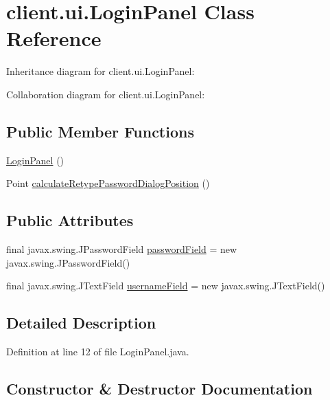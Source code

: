 \hypertarget{classclient_1_1ui_1_1_login_panel}{}\section{client.\+ui.\+Login\+Panel Class Reference}
\label{classclient_1_1ui_1_1_login_panel}


Inheritance diagram for client.\+ui.\+Login\+Panel\+:


Collaboration diagram for client.\+ui.\+Login\+Panel\+:
\subsection*{Public Member Functions}
\begin{DoxyCompactItemize}
\item 
\hyperlink{classclient_1_1ui_1_1_login_panel_a697f38b937f048e562c634c713d90885}{Login\+Panel} ()
\item 
Point \hyperlink{classclient_1_1ui_1_1_login_panel_a9726aa2bc3416aa22ad43d2b4b9eed70}{calculate\+Retype\+Password\+Dialog\+Position} ()
\end{DoxyCompactItemize}
\subsection*{Public Attributes}
\begin{DoxyCompactItemize}
\item 
final javax.\+swing.\+J\+Password\+Field \hyperlink{classclient_1_1ui_1_1_login_panel_a4b3258e8faace6462f58c79cb4a08835}{password\+Field} = new javax.\+swing.\+J\+Password\+Field()
\item 
final javax.\+swing.\+J\+Text\+Field \hyperlink{classclient_1_1ui_1_1_login_panel_a3a01950b4312782aa5d78d22d257e19e}{username\+Field} = new javax.\+swing.\+J\+Text\+Field()
\end{DoxyCompactItemize}


\subsection{Detailed Description}


Definition at line 12 of file Login\+Panel.\+java.



\subsection{Constructor \& Destructor Documentation}
\hypertarget{classclient_1_1ui_1_1_login_panel_a697f38b937f048e562c634c713d90885}{}\label{classclient_1_1ui_1_1_login_panel_a697f38b937f048e562c634c713d90885} 
